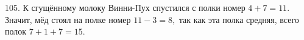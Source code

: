 105. К сгущённому молоку Винни-Пух спустился с полки номер $4+7=11.$ Значит, мёд стоял на полке номер $11-3=8,$ так как эта полка средняя, всего полок $7+1+7=15.$\\
